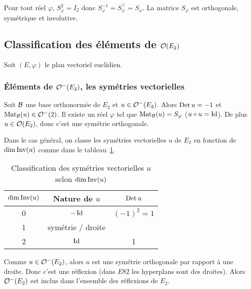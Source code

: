 \begin{corth}
  Pour tout réel $\varphi$, $S_\varphi^2=I_2$ donc $S_\varphi^{-1}=S_\varphi^\top=S_\varphi$. La matrice $S_\varphi$ est orthogonale, symétrique et involutive.
\end{corth}

\subsection{Classification des éléments de $\mathcal{O}\!\left(E_2\right)$}

Soit $(E,\varphi)$ le plan vectoriel euclidien.

\subsubsection{Éléments de $\mathcal{O}^{-}\!\left(E_2\right)$, les symétries vectorielles}

Soit $\mathcal{B}$ une base orthonormée de $E_2$ et $u \in \mathcal{O}^{-}\!\left(E_2\right)$. Alors $\operatorname{Det} u=-1$ et $\mathrm{Mat}_{\mathcal{B}}(u) \in \mathcal{O}^{-}\!\left(2\right)$. Il existe un réel $\varphi$ tel que $\mathrm{Mat}_{\mathcal{B}}(u)=S_\varphi$ ($u \circ u=\operatorname{Id}$). De plus $u \in \mathcal{O}\!\left(E_2\right)$, donc c'est une symétrie orthogonale. 

Dans le cas général, on classe les symétries vectorielles $u$ de $E_2$ en fonction de $\operatorname{dim} \operatorname{Inv}(u)$ comme dans le tableau~\ref{tab:SymVect}.

\begin{table}[!h]
  \centering
  \begin{tabular}{|c|c|c|}\hline
    $\operatorname{dim}\operatorname{Inv}(u)$ & Nature de $u$ & $\operatorname{Det} u$ \\ \hline
    0 & $-\operatorname{Id}$ & $(-1)^2=1$ \\
    1 & symétrie / droite & \\
    2 & $\operatorname{Id}$ & 1 \\
    \hline
  \end{tabular}
  \caption{Classification des symétries vectorielles $u$ selon $\operatorname{dim}\operatorname{Inv}(u)$}
  \label{tab:SymVect}
\end{table}

Comme $u \in \mathcal{O}^{-}\!\left(E_2\right)$, alors $u$ est une symétrie orthogonale par rapport à une droite. Donc c'est une réflexion (dans $E82$ les hyperplans sont des droites). Alors $\mathcal{O}^{-}\!\left(E_2\right)$ est inclus dans l'ensemble des réflexions de $E_2$.

